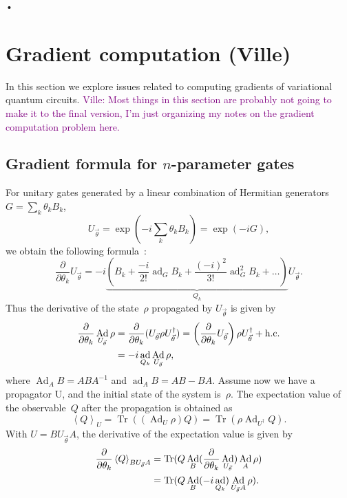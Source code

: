 \documentclass[aps,pra,10pt,twocolumn,groupedaddress,nofootinbib]{revtex4-1}
\theoremstyle{plain}
\DeclareMathOperator{\tr}{Tr}
\DeclareMathOperator{\Ad}{Ad}
\DeclareMathOperator{\ad}{ad}
\newcommand{\pd}[2]{\frac{\partial #1}{\partial #2}}  %
\newcommand{\be}{\begin{equation}}
\newcommand{\ee}{\end{equation}}
\newcommand{\expect}[1]{\ensuremath{\left\langle #1 \right\rangle}} %
\newcommand{\ville}[1]{\textcolor{purple}{Ville: #1}}
\begin{document}
%


\appendix




\clearpage
\textsc{•}\appendix
\section{Gradient computation (Ville)}

In this section we explore issues related to computing gradients of variational quantum circuits.
\ville{Most things in this section are probably not going to make it to the final version,
I'm just organizing my notes on the gradient computation problem here.}


\subsection{Gradient formula for $n$-parameter gates}
\label{sec:gradient_formula_for_n_parameter_gates}
For unitary gates generated by a linear combination of Hermitian generators
$G = \sum_k \theta_k B_k$,
\be
U_{\vec{\theta}} = \exp(-i \sum_k \theta_k B_k) = \exp(-i G),
\ee
we obtain the following formula~\cite{dynamo_manual}:
\be
\pd{}{\theta_k} U_{\vec{\theta}}
= -i \underbrace{\left(B_k +\frac{-i}{2!}\ad_G B_k +\frac{(-i)^2}{3!}\ad_G^2 B_k +\ldots \right)}_{Q_k}
U_{\vec{\theta}}.
\ee
Thus the derivative of the state~$\rho$ propagated by $U_{\vec{\theta}}$ is given by
\begin{align}
  \notag
  \pd{}{\theta_k} \Ad_{U_{\vec{\theta}}} \rho
  &= \pd{}{\theta_k} (U_{\vec{\theta}} \rho U_{\vec{\theta}}^\dagger)
  = \left(\pd{}{\theta_k} U_{\vec{\theta}}\right) \rho U_{\vec{\theta}}^\dagger +\text{h.c.}\\
  &= -i \ad_{Q_k} \Ad_{U_{\vec{\theta}}} \rho,
\end{align}
where $\Ad_{A} B = A B A^{-1}$ and $\ad_{A} B = A B - B A$.
Assume now we have a propagator U, and the initial state of the system is~$\rho$.
The expectation value of the observable~$Q$ after the propagation is obtained as
\be
\label{eq:Q_ev}
\expect{Q}_U = \tr((\Ad_{U}\rho) Q)
= \tr(\rho \Ad_{U^\dagger}Q).
\ee
With $U=B U_{\vec{\theta}} A$, the derivative of the expectation value is given by
\begin{align}
  \label{eq:d_ev}
  \notag
  \pd{}{\theta_k} \expect{Q}_{B U_{\vec{\theta}} A}
  &= \tr(Q \Ad_B (\pd{}{\theta_k} \Ad_{U_{\vec{\theta}}}) \Ad_A \rho)\\
  &= \tr(Q \Ad_B (-i \ad_{Q_k}) \Ad_{U_{\vec{\theta}} A} \rho).
\end{align}
\end{document}
